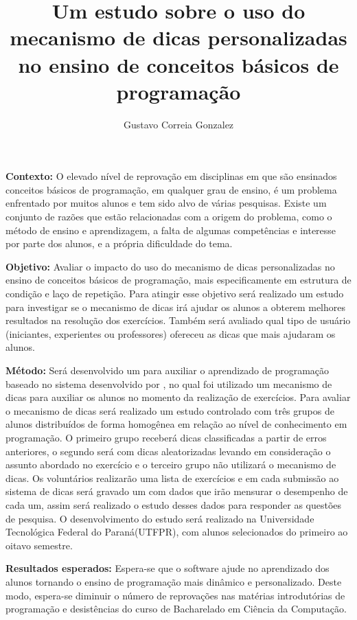 \documentclass[12pt,english,brazil,a4paper,utf8,oneside]{utfpr-tcc}
\author{Gustavo Correia Gonzalez}  %
\title{Um estudo sobre o uso do mecanismo de dicas personalizadas no ensino de conceitos básicos de programação} %
\begin{document}
	
\frontmatter
\maketitle

\begin{resumo}
\textbf{Contexto:} 
O elevado nível de reprovação em disciplinas em que são ensinados conceitos básicos de programação, em qualquer grau de ensino, é um problema enfrentado por muitos alunos e tem sido alvo de várias pesquisas. Existe um conjunto de razões que estão relacionadas com a origem do problema, como o método de ensino e aprendizagem, a falta de algumas competências e interesse por parte dos alunos, e a própria dificuldade do tema.

\textbf{Objetivo:} Avaliar o impacto do uso do mecanismo de dicas personalizadas no ensino de conceitos básicos de programação, mais especificamente em estrutura de condição e laço de repetição. Para atingir esse objetivo será realizado um estudo para investigar se o mecanismo de dicas irá ajudar os alunos a obterem melhores resultados na resolução dos exercícios. Também será avaliado qual tipo de usuário (iniciantes, experientes ou professores) ofereceu as dicas que mais ajudaram os alunos.

\textbf{Método:} Será desenvolvido um  para auxiliar o aprendizado de programação baseado no sistema  desenvolvido por , no qual foi utilizado um mecanismo de dicas para auxiliar os alunos no momento da realização de exercícios. Para avaliar o mecanismo de dicas será realizado um estudo controlado com três grupos de alunos distribuídos de forma homogênea em relação ao nível de conhecimento em programação. O primeiro grupo receberá dicas classificadas a partir de erros anteriores, o segundo será com dicas aleatorizadas levando em consideração o assunto abordado no exercício e o terceiro grupo não utilizará o mecanismo de dicas. Os voluntários realizarão uma lista de exercícios e em cada submissão ao sistema de dicas será gravado um  com dados que irão mensurar o desempenho de cada um, assim será realizado o estudo desses dados para responder as questões de pesquisa.
O desenvolvimento do estudo será realizado na Universidade Tecnológica Federal do Paraná(UTFPR), com alunos selecionados do primeiro ao oitavo semestre.


\textbf{Resultados esperados:} Espera-se que o software ajude no aprendizado dos alunos tornando o ensino de programação mais dinâmico e personalizado. Deste modo, espera-se diminuir o número de reprovações nas matérias introdutórias de programação e desistências do curso de Bacharelado em Ciência da Computação.


\end{resumo}
\end{document}
